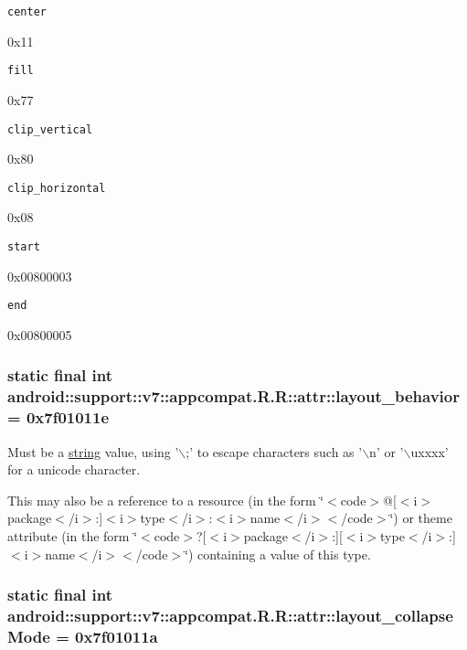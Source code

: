 {\tt center}

0x11

{\tt fill}

0x77

{\tt clip\_\-vertical}

0x80

{\tt clip\_\-horizontal}

0x08

{\tt start}

0x00800003

{\tt end}

0x00800005\hypertarget{classandroid_1_1support_1_1v7_1_1appcompat_1_1_r_1_1attr_765d70239fdbca8538f0c4ea6f76ca78}{
\subsubsection[{layout\_\-behavior}]{\setlength{\rightskip}{0pt plus 5cm}static final int android::support::v7::appcompat.R.R::attr::layout\_\-behavior = 0x7f01011e}}
\label{classandroid_1_1support_1_1v7_1_1appcompat_1_1_r_1_1attr_765d70239fdbca8538f0c4ea6f76ca78}


Must be a \hyperlink{classandroid_1_1support_1_1v7_1_1appcompat_1_1_r_1_1string}{string} value, using '$\backslash$;' to escape characters such as '$\backslash$n' or '$\backslash$uxxxx' for a unicode character. 

This may also be a reference to a resource (in the form \char`\"{}$<$code$>$@\mbox{[}$<$i$>$package$<$/i$>$:\mbox{]}$<$i$>$type$<$/i$>$:$<$i$>$name$<$/i$>$$<$/code$>$\char`\"{}) or theme attribute (in the form \char`\"{}$<$code$>$?\mbox{[}$<$i$>$package$<$/i$>$:\mbox{]}\mbox{[}$<$i$>$type$<$/i$>$:\mbox{]}$<$i$>$name$<$/i$>$$<$/code$>$\char`\"{}) containing a value of this type. \hypertarget{classandroid_1_1support_1_1v7_1_1appcompat_1_1_r_1_1attr_579195d630ac3e197218ab8e78f1d819}{
\subsubsection[{layout\_\-collapseMode}]{\setlength{\rightskip}{0pt plus 5cm}static final int android::support::v7::appcompat.R.R::attr::layout\_\-collapseMode = 0x7f01011a}}
\label{classandroid_1_1support_1_1v7_1_1appcompat_1_1_r_1_1attr_579195d630ac3e197218ab8e78f1d819}



